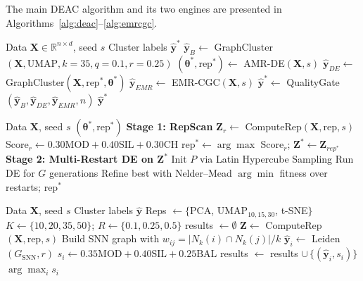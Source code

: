 \documentclass[journal]{IEEEtran}
\begin{document}
The main DEAC algorithm and its two engines are presented in Algorithms~\ref{alg:deac}--\ref{alg:emrcgc}.

\begin{algorithm}[!t]
\caption{DEAC --- Main Algorithm}
\label{alg:deac}
\begin{algorithmic}[1]
\REQUIRE Data $\mathbf{X} \in \mathbb{R}^{n \times d}$, seed $s$
\ENSURE Cluster labels $\hat{\mathbf{y}}^*$
\STATE $\hat{\mathbf{y}}_B \leftarrow$ GraphCluster$(\mathbf{X},\text{UMAP}, k{=}35, q{=}0.1, r{=}0.25)$
\STATE $(\boldsymbol{\theta}^*, \text{rep}^*) \leftarrow$ AMR-DE$(\mathbf{X}, s)$ 
\STATE $\hat{\mathbf{y}}_{DE} \leftarrow$ GraphCluster$(\mathbf{X}, \text{rep}^*, \boldsymbol{\theta}^*)$
\STATE $\hat{\mathbf{y}}_{EMR} \leftarrow$ EMR-CGC$(\mathbf{X}, s)$ 
\STATE $\hat{\mathbf{y}}^* \leftarrow$ QualityGate$(\hat{\mathbf{y}}_B, \hat{\mathbf{y}}_{DE}, \hat{\mathbf{y}}_{EMR}, n)$
\RETURN $\hat{\mathbf{y}}^*$
\end{algorithmic}
\end{algorithm}

\begin{algorithm}[!t]
\caption{AMR-DE --- Engine 1}
\label{alg:amrde}
\begin{algorithmic}[1]
\REQUIRE Data $\mathbf{X}$, seed $s$
\ENSURE $(\boldsymbol{\theta}^*, \text{rep}^*)$
\STATE \textbf{Stage 1: RepScan}
  \STATE $\mathbf{Z}_r \leftarrow$ ComputeRep$(\mathbf{X}, \text{rep}, s)$
  \STATE Score$_r \leftarrow 0.30\text{MOD}+0.40\text{SIL}+0.30\text{CH}$
\ENDFOR
\STATE rep$^* \leftarrow \arg\max$ Score$_r$; $\mathbf{Z}^* \leftarrow \mathbf{Z}_{rep^*}$
\STATE \textbf{Stage 2: Multi-Restart DE on $\mathbf{Z}^*$}
  \STATE Init $P$ via Latin Hypercube Sampling
  \STATE Run DE for $G$ generations
  \STATE Refine best with Nelder--Mead
\ENDFOR
\RETURN $\arg\min$ fitness over restarts; rep$^*$
\end{algorithmic}
\end{algorithm}

\begin{algorithm}[!t]
\caption{EMR-CGC --- Engine 2}
\label{alg:emrcgc}
\begin{algorithmic}[1]
\REQUIRE Data $\mathbf{X}$, seed $s$
\ENSURE Cluster labels $\hat{\mathbf{y}}$
\STATE Reps $\leftarrow \{$PCA, UMAP$_{10,15,30}$, t-SNE$\}$
\STATE $K \leftarrow \{10, 20, 35, 50\}$; $R \leftarrow \{0.1, 0.25, 0.5\}$
\STATE results $\leftarrow \emptyset$
  \STATE $\mathbf{Z} \leftarrow$ ComputeRep$(\mathbf{X}, \text{rep}, s)$
    \STATE Build SNN graph with $w_{ij}=|N_k(i)\cap N_k(j)|/k$
    \STATE $\hat{\mathbf{y}}_i \leftarrow$ Leiden$(G_{\text{SNN}}, r)$
    \STATE $s_i \leftarrow 0.35\text{MOD}+0.40\text{SIL}+0.25\text{BAL}$
    \STATE results $\leftarrow$ results $\cup\,\{(\hat{\mathbf{y}}_i, s_i)\}$
  \ENDFOR
\ENDFOR
\RETURN $\arg\max_i s_i$
\end{algorithmic}
\end{algorithm}
\end{document}
